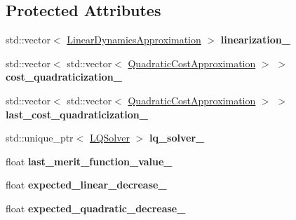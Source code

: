\subsection*{Protected Attributes}
\begin{DoxyCompactItemize}
\item 
std\+::vector$<$ \hyperlink{structilqgames_1_1_linear_dynamics_approximation}{Linear\+Dynamics\+Approximation} $>$ {\bfseries linearization\+\_\+}\hypertarget{classilqgames_1_1_i_l_q_solver_a8b02b9f196152504e2b4f746704f99a7}{}\label{classilqgames_1_1_i_l_q_solver_a8b02b9f196152504e2b4f746704f99a7}

\item 
std\+::vector$<$ std\+::vector$<$ \hyperlink{structilqgames_1_1_quadratic_cost_approximation}{Quadratic\+Cost\+Approximation} $>$ $>$ {\bfseries cost\+\_\+quadraticization\+\_\+}\hypertarget{classilqgames_1_1_i_l_q_solver_af45202b8baa2630b5a3c47c6bf853005}{}\label{classilqgames_1_1_i_l_q_solver_af45202b8baa2630b5a3c47c6bf853005}

\item 
std\+::vector$<$ std\+::vector$<$ \hyperlink{structilqgames_1_1_quadratic_cost_approximation}{Quadratic\+Cost\+Approximation} $>$ $>$ {\bfseries last\+\_\+cost\+\_\+quadraticization\+\_\+}\hypertarget{classilqgames_1_1_i_l_q_solver_ad23a3a3fc170e9b966c9232b9c9de971}{}\label{classilqgames_1_1_i_l_q_solver_ad23a3a3fc170e9b966c9232b9c9de971}

\item 
std\+::unique\+\_\+ptr$<$ \hyperlink{classilqgames_1_1_l_q_solver}{L\+Q\+Solver} $>$ {\bfseries lq\+\_\+solver\+\_\+}\hypertarget{classilqgames_1_1_i_l_q_solver_afb4b2fed2450e965d347dd6a38a33bb6}{}\label{classilqgames_1_1_i_l_q_solver_afb4b2fed2450e965d347dd6a38a33bb6}

\item 
float {\bfseries last\+\_\+merit\+\_\+function\+\_\+value\+\_\+}\hypertarget{classilqgames_1_1_i_l_q_solver_a41e4e2648d28a5b2000f6fb24336a7f9}{}\label{classilqgames_1_1_i_l_q_solver_a41e4e2648d28a5b2000f6fb24336a7f9}

\item 
float {\bfseries expected\+\_\+linear\+\_\+decrease\+\_\+}\hypertarget{classilqgames_1_1_i_l_q_solver_ae90016435471a1f237f87db731d7bbf1}{}\label{classilqgames_1_1_i_l_q_solver_ae90016435471a1f237f87db731d7bbf1}

\item 
float {\bfseries expected\+\_\+quadratic\+\_\+decrease\+\_\+}\hypertarget{classilqgames_1_1_i_l_q_solver_abebd5254abd151949a603ce33dc59a14}{}\label{classilqgames_1_1_i_l_q_solver_abebd5254abd151949a603ce33dc59a14}

\end{DoxyCompactItemize}


